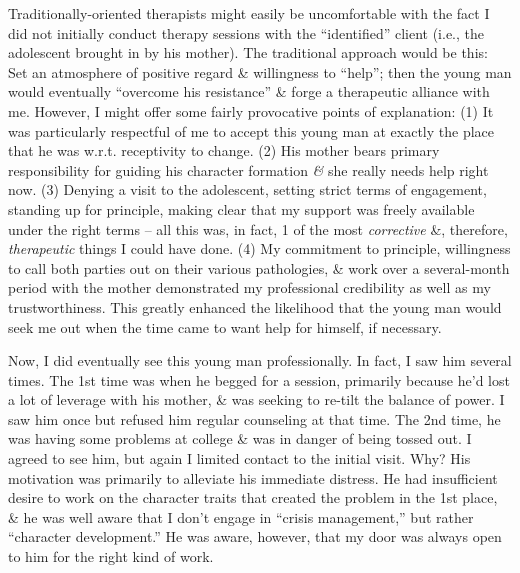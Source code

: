 \documentclass{article}
\numberwithin{equation}{section}
\begin{document}
Traditionally-oriented therapists might easily be uncomfortable with the fact I did not initially conduct therapy sessions with the ``identified'' client (i.e., the adolescent brought in by his mother). The traditional approach would be this: Set an atmosphere of positive regard \& willingness to ``help''; then the young man would eventually ``overcome his resistance'' \& forge a therapeutic alliance with me. However, I might offer some fairly provocative points of explanation: (1) It was particularly respectful of me to accept this young man at exactly the place that he was w.r.t. receptivity to change. (2) His mother bears primary responsibility for guiding his character formation \textit{\&} she really needs help right now. (3) Denying a visit to the adolescent, setting strict terms of engagement, standing up for principle, making clear that my support was freely available under the right terms -- all this was, in fact, 1 of the most \textit{corrective} \&, therefore, \textit{therapeutic} things I could have done. (4) My commitment to principle, willingness to call both parties out on their various pathologies, \& work over a several-month period with the mother demonstrated my professional credibility as well as my trustworthiness. This greatly enhanced the likelihood that the young man would seek me out when the time came to want help for himself, if necessary.

Now, I did eventually see this young man professionally. In fact, I saw him several times. The 1st time was when he begged for a session, primarily because he'd lost a lot of leverage with his mother, \& was seeking to re-tilt the balance of power. I saw him once but refused him regular counseling at that time. The 2nd time, he was having some problems at college \& was in danger of being tossed out. I agreed to see him, but again I limited contact to the initial visit. Why? His motivation was primarily to alleviate his immediate distress. He had insufficient desire to work on the character traits that created the problem in the 1st place, \& he was well aware that I don't engage in ``crisis management,'' but rather ``character development.'' He was aware, however, that my door was always open to him for the right kind of work.
\end{document}
